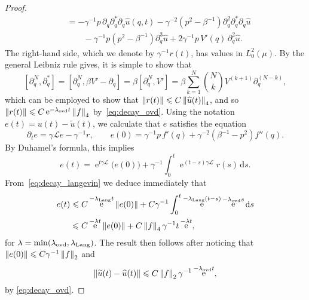 \documentclass[11pt,a4paper]{article}
\DeclareMathOperator{\e}{e}
\newcommand{\commut}[2]{[#1, #2]}
\renewcommand{\d}{\mathrm d}
\theoremstyle{plain}
\numberwithin{equation}{section}
\renewcommand{\leq}{\leqslant}
\begin{document}
\begin{proof}
\begin{align*}
        &= - \gamma^{-1} p \, \partial_q \partial_q^* \partial_q \widehat u(q, t) - \gamma^{-2} (p^2 - \beta^{-1})  \partial_q^{2} \partial_q^* \partial_q \widehat u \\
        &\qquad - \gamma^{-1} p (p^2 - \beta^{-1}) \partial_q^{3} \widehat u + 2 \gamma^{-1} p \, V'(q) \, \partial_q^2 \widehat u.
    \end{align*}
    The right-hand side, which we denote by $\gamma^{-1} r(t)$, has values in $L^2_0(\mu)$.
    By the general Leibniz rule gives,
    it is simple to show that
    \begin{equation}
        \label{eq:commutators_derivatives}
        \commut{\partial_q^N}{\partial_q^*}
        = \commut{\partial_q^N}{\beta V' - \partial_q}
        = \beta \commut{\partial_q^N}{V'}
        = \beta \sum_{k=1}^{N} {N \choose k} V^{(k+1)} \partial_q^{(N-k)},
    \end{equation}
    which can be employed to show that $\norm{r(t)} \leq C \norm{\widehat u(t)}_4$,
    and so $\norm{r(t)} \leq C \e^{-\lambda_{\rm ovd} t} \norm{f}_4$ by~\eqref{eq:decay_ovd}.
    Using the notation $e(t) = u(t) - \widetilde u(t)$,
    we calculate that $e$ satisfies the equation
    \[
        \partial_t e = \gamma \mathcal L e - \gamma^{-1} r, \qquad
        e(0) = \gamma^{-1} p \, f'(q) + \gamma^{-2} (\beta^{-1} - p^2) f''(q).
    \]
    By Duhamel's formula,
    this implies
    \[
        e(t) = \e^{t \gamma \mathcal L} \bigl( e(0) \bigr) + \gamma^{-1} \int_{0}^{t} \e^{(t- s) \gamma \mathcal L} r(s) \, \d s.
    \]
    From~\eqref{eq:decay_langevin} we deduce immediately that
    \begin{align*}
        e(t)
        &\leq C \e^{- \lambda_{\rm Lang} t} \norm{e(0)}
        + C \gamma^{-1} \int_{0}^{t} \e^{- \lambda_{\rm Lang} (t-s)} \e^{-\lambda_{\rm ovd} s} \d s \\
        &\leq C \e^{- \lambda t} \norm{e(0)} + C \norm{f}_4 \gamma^{-1} t \e^{- \lambda t},
    \end{align*}
    for $\lambda = \min(\lambda_{\rm ovd}, \lambda_{\rm Lang})$.
    The result then follows after noticing that $\norm{e(0)} \leq C \gamma^{-1} \norm{f}_2$ and
    \[
        \norm{\widetilde u(t) - \widehat u(t)} \leq C \norm{f}_2 \gamma^{-1} \e^{- \lambda_{\rm ovd} t},
    \]
    by \eqref{eq:decay_ovd}.
\end{proof}
\end{document}
